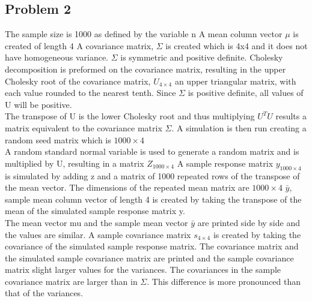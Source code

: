 \documentclass{article}
\begin{document}
\begin{flushleft}
\section*{Problem 2}
The sample size is 1000 as defined by the variable n\medbreak
A mean column vector $\mu$ is created of length 4\medbreak
A covariance matrix, $\Sigma$ is created which is 4x4 and it does not have homogeneous variance. $\Sigma$ is symmetric and positive definite.\medbreak
Cholesky decomposition is preformed on the covariance matrix, resulting in the upper Cholesky root of the covariance matrix, $U_{4\times 4}$ an upper triangular matrix, with each value rounded to the nearest tenth. Since $\Sigma$ is positive definite, all values of U will be positive.\\
The transpose of U is the lower Cholesky root and thus multiplying $U^{T}U$ results a matrix equivalent to the covariance matrix $\Sigma$.\medbreak
A simulation is then run creating a random seed matrix which is $1000\times 4$\\
A random standard normal variable is used to generate a random matrix and is multiplied by U, resulting in a matrix $Z_{1000 \times 4}$\medbreak
A sample response matrix $y_{1000 \times 4}$ is simulated by adding z and a matrix of 1000 repeated rows of the transpose of the mean vector. The dimensions of the repeated mean matrix are $1000\times 4$\medbreak
$\bar{y}$, sample mean column vector of length 4 is created by taking the transpose of the mean of the simulated sample response matrix y.\\
The mean vector mu and the sample mean vector $\bar{y}$ are printed side by side and the values are similar.\medbreak
A sample covariance matrix $s_{4\times 4}$ is created by taking the covariance of the simulated sample response matrix.\medbreak
The covariance matrix and the simulated sample covariance matrix are printed and the sample covariance matrix slight larger values for the variances. The covariances in the sample covariance matrix are larger than in $\Sigma$. This difference is more pronounced than that of the variances.
\end{flushleft}
\end{document}
